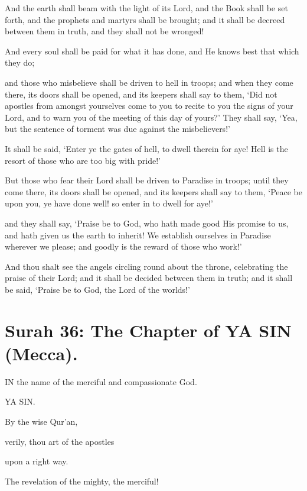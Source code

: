 \documentclass[fontsize=14pt, letterpaper, notitlepage, openany, DIV=12]{scrbook} %
\begin{document}
\noindent[39:69]
And the earth shall beam with the light of its Lord, and the Book shall be set forth, and
the prophets and martyrs shall be brought; and it shall be decreed between them in truth, and they
shall not be wronged!

\noindent[39:70]
And every soul shall be paid for what it has done, and He knows best that which they do;

\noindent[39:71]
and those who misbelieve shall be driven to hell in troops; and when they come there, its
doors shall be opened, and its keepers shall say to them, `Did not apostles from amongst
yourselves come to you to recite to you the signs of your Lord, and to warn you of the meeting of
this day of yours?' They shall say, `Yea, but the sentence of torment was due against the
misbelievers!'

\noindent[39:72]
It shall be said, `Enter ye the gates of hell, to dwell therein for aye! Hell is the resort of
those who are too big with pride!'

\noindent[39:73]
But those who fear their Lord shall be driven to Paradise in troops; until they come there,
its doors shall be opened, and its keepers shall say to them, `Peace be upon you, ye have done
well! so enter in to dwell for aye!'

\noindent[39:74]
and they shall say, `Praise be to God, who hath made good His promise to us, and hath
given us the earth to inherit! We establish ourselves in Paradise wherever we please; and goodly
is the reward of those who work!'

\noindent[39:75]
And thou shalt see the angels circling round about the throne, celebrating the praise of
their Lord; and it shall be decided between them in truth; and it shall be said, `Praise be to God,
the Lord of the worlds!'


\section{Surah 36: The Chapter of YA SIN (Mecca).}


IN the name of the merciful and compassionate God.

\noindent[36:1]
YA SIN.

\noindent[36:2]
By the wise Qur'an,

\noindent[36:3]
verily, thou art of the apostles

\noindent[36:4]
upon a right way.

\noindent[36:5]
The revelation of the mighty, the merciful!
\end{document}
